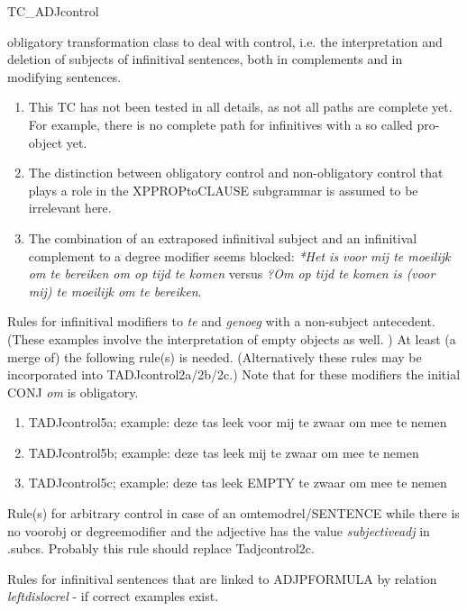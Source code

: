 \begin{mruleclass}{TC\_ADJcontrol}
\begin{classdescr}
\kind obligatory transformation class
\classtask to deal with control, 
i.e. the interpretation and deletion of subjects of 
infinitival sentences, both in complements and in modifying sentences.

\classremarks\mbox{}
\begin{enumerate}
\item 
This TC has not been tested in all details, as not all paths are complete yet.
For example, there is no complete path for 
infinitives with a so called pro-object yet. 
\item
The distinction between obligatory control and non-obligatory control that 
plays a role in the XPPROPtoCLAUSE subgrammar is assumed to be irrelevant here.
\item

The combination of an extraposed infinitival subject 
and an infinitival complement 
to a degree modifier seems blocked: {\em 
 *Het is voor mij te moeilijk om te bereiken
 om  op tijd te komen} versus 
{\em ?Om op tijd te komen is (voor mij) te moeilijk om te bereiken}.
\end{enumerate}

\nofilters

\nospeedrules

\begin{plannedrules}
\item 
Rules for infinitival 
modifiers to {\em te} and {\em genoeg} with a non-subject antecedent. 
(These examples involve the interpretation of empty objects as well.
) At least (a merge of) the following rule(s) is needed. 
(Alternatively these rules may be incorporated into TADJcontrol2a/2b/2c.)
Note that for these modifiers the initial CONJ {\em om} is obligatory.
\begin{enumerate}
\item
TADJcontrol5a; example: deze tas leek voor mij te zwaar om mee te nemen
\item
TADJcontrol5b; example: deze tas leek  mij te zwaar om mee te nemen
\item
TADJcontrol5c; example: deze tas leek EMPTY te zwaar om mee te nemen
\end{enumerate}

\item Rule(s) for arbitrary control in case of an omtemodrel/SENTENCE
while there is no voorobj or degreemodifier and the adjective has the value 
{\em subjectiveadj} in .subcs. Probably this rule should 
replace Tadjcontrol2c. 
\item Rules for 
infinitival sentences that are linked to ADJPFORMULA by relation {\em 
leftdislocrel} - if correct examples exist.
\end{plannedrules}


\end{classdescr}
\end{mruleclass}
